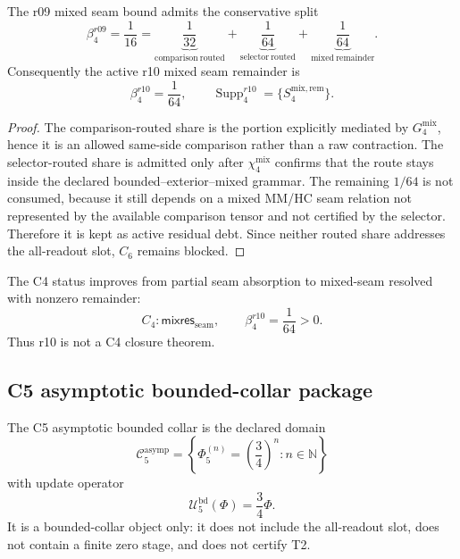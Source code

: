 \begin{proposition}
\label{prop:v470-r10-mixed-seam-split}
The r09 mixed seam bound admits the conservative split
\[
\beta_4^{r09}
=
\frac1{16}
=
\underbrace{\frac1{32}}_{\mathrm{comparison\ routed}}
+
\underbrace{\frac1{64}}_{\mathrm{selector\ routed}}
+
\underbrace{\frac1{64}}_{\mathrm{mixed\ remainder}}.
\]
Consequently the active r10 mixed seam remainder is
\[
\beta_4^{r10}=\frac1{64},
\qquad
\operatorname{Supp}_4^{r10}=\{S_4^{\mathrm{mix,rem}}\}.
\]
\end{proposition}

\begin{proof}
The comparison-routed share is the portion explicitly mediated by
\(G_4^{\mathrm{mix}}\), hence it is an allowed same-side comparison rather than a
raw contraction.  The selector-routed share is admitted only after
\(\chi_4^{\mathrm{mix}}\) confirms that the route stays inside the declared
bounded--exterior--mixed grammar.  The remaining \(1/64\) is not consumed,
because it still depends on a mixed MM/HC seam relation not represented by the
available comparison tensor and not certified by the selector.  Therefore it is
kept as active residual debt.  Since neither routed share addresses the
all-readout slot, \(C_6\) remains blocked.
\end{proof}

\begin{corollary}[r10 C4 status]
\label{cor:v470-r10-c4-status}
The C4 status improves from partial seam absorption to mixed-seam resolved with
nonzero remainder:
\[
C_4:
\mathsf{mixres}_{\mathrm{seam}},
\qquad
\beta_4^{r10}=\frac1{64}>0.
\]
Thus r10 is not a C4 closure theorem.
\end{corollary}

\subsection{C5 asymptotic bounded-collar package}
\label{subsec:v470-r10-c5-asymptotic-collar}

\begin{definition}
\label{def:v470-r10-asymptotic-bounded-collar}
The C5 asymptotic bounded collar is the declared domain
\[
\mathcal C_5^{\mathrm{asymp}}
=\left\{\Phi_5^{(n)}=\left(\frac34\right)^n:
 n\in\mathbb N\right\}
\]
with update operator
\[
\mathcal U_5^{\mathrm{bd}}(\Phi)=\frac34\Phi.
\]
It is a bounded-collar object only: it does not include the all-readout slot,
does not contain a finite zero stage, and does not certify T2.
\end{definition}

